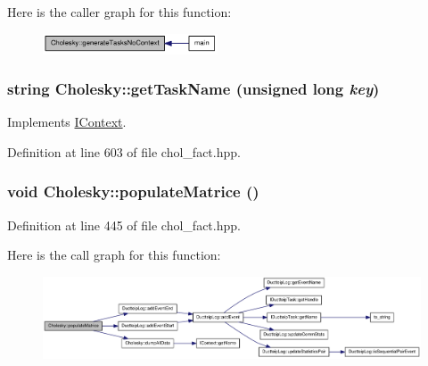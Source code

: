 Here is the caller graph for this function:\nopagebreak
\begin{figure}[H]
\begin{center}
\leavevmode
\includegraphics[width=147pt]{class_cholesky_a718109d74c3316742c6accccdb010a92_icgraph}
\end{center}
\end{figure}
\hypertarget{class_cholesky_abba68c13e63db6e4f3637e0d68af9c45}{
\subsubsection[{getTaskName}]{\setlength{\rightskip}{0pt plus 5cm}string Cholesky::getTaskName (unsigned long {\em key})}}
\label{class_cholesky_abba68c13e63db6e4f3637e0d68af9c45}


Implements \hyperlink{class_i_context_a8f811884fc095b04c6f6f7df5be5b51d}{IContext}.

Definition at line 603 of file chol\_\-fact.hpp.\hypertarget{class_cholesky_ae5281abaa5b986b2dc88fff04aed959c}{
\subsubsection[{populateMatrice}]{\setlength{\rightskip}{0pt plus 5cm}void Cholesky::populateMatrice ()}}
\label{class_cholesky_ae5281abaa5b986b2dc88fff04aed959c}


Definition at line 445 of file chol\_\-fact.hpp.

Here is the call graph for this function:\nopagebreak
\begin{figure}[H]
\begin{center}
\leavevmode
\includegraphics[width=420pt]{class_cholesky_ae5281abaa5b986b2dc88fff04aed959c_cgraph}
\end{center}
\end{figure}


